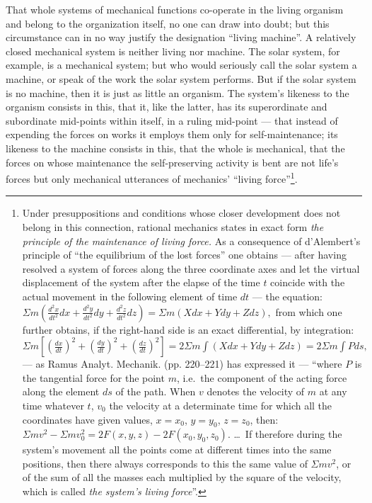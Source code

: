\documentclass[12pt,a4paper]{book}
\begin{document}
\setcounter{footnote}{0}
That whole systems of mechanical functions co-operate in the living organism and
belong to the organization itself, no one can draw into doubt; but this circumstance
can in no way justify the designation ``living machine''. A relatively closed
mechanical system is neither living nor machine. The solar system, for example, is a
mechanical system; but who would seriously call the solar system a machine, or speak
of the work the solar system performs. But if the solar system is no machine, then
it is just as little an organism. The system's likeness to the organism consists in
this, that it, like the latter, has its superordinate and subordinate mid-points
within itself, in a ruling mid-point --- that instead of expending the forces on
works it employs them only for self-maintenance; its likeness to the machine
consists in this, that the whole is mechanical, that the forces on whose maintenance
the self-preserving activity is bent are not life's forces but only mechanical
utterances of mechanics' ``living force''\footnote{Under presuppositions and
conditions whose closer development does not belong in this connection, rational
mechanics states in exact form \emph{the principle of the maintenance of living
force.} As a consequence of d'Alembert's principle of ``the equilibrium of the lost
forces'' one obtains --- after having resolved a system of forces along the three
coordinate axes and let the virtual displacement of the system after the elapse of
the time $t$ coincide with the actual movement in the following element of time
$dt$ --- the equation:
$\Sigma m\left(\frac{d^2x}{dt^2}dx + \frac{d^2y}{dt^2}dy +
\frac{d^2z}{dt^2}dz\right) = \Sigma m(Xdx + Ydy + Zdz),$
from which one further obtains, if the right-hand side is an exact differential, by
integration:
$\Sigma m\left[\left(\frac{dx}{dt}\right)^2 +
\left(\frac{dy}{dt}\right)^2 + \left(\frac{dz}{dt}\right)^2\right] =
2\Sigma m\int(Xdx + Ydy + Zdz) = 2\Sigma m\int Pds,$
--- as Ramus Analyt. Mechanik. (pp. 220--221) has expressed it --- ``where $P$ is
the tangential force for the point $m$, i.e.\ the component of the acting force
along the element $ds$ of the path. When $v$ denotes the velocity of $m$ at any time
whatever $t$, $v_0$ the velocity at a determinate time for which all the coordinates
have given values, $x = x_0$, $y = y_0$, $z = z_0$, then:
$\Sigma mv^2 - \Sigma mv_0^2 = 2F(x, y, z) - 2F(x_0, y_0, z_0).$
\ldots\ If therefore during the system's movement all the points come at different
times into the same positions, then there always corresponds to this the same value
of $\Sigma mv^2$, or of the sum of all the masses each multiplied by the square of
the velocity, which is called \emph{the system's living force}''.}.
\end{document}

